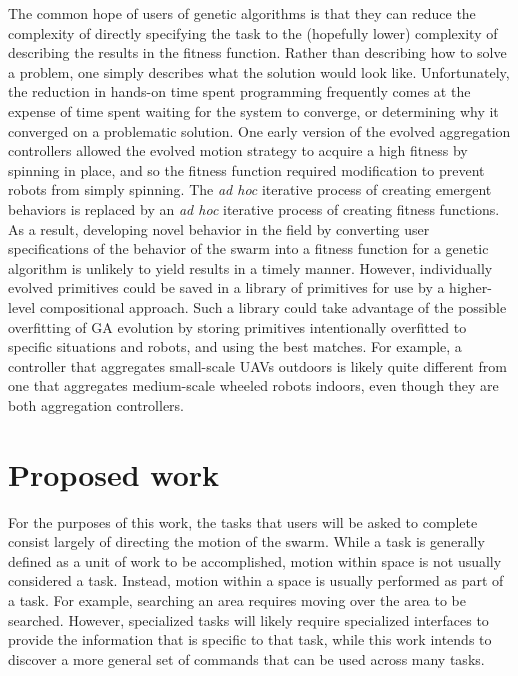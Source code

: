 \documentclass[]{article}
\begin{document}
The common hope of users of genetic algorithms is that they can reduce the complexity of directly specifying the task to the (hopefully lower) complexity of describing the results in the fitness function.
Rather than describing how to solve a problem, one simply describes what the solution would look like. 
Unfortunately, the reduction in hands-on time spent programming frequently comes at the expense of time spent waiting for the system to converge, or determining why it converged on a problematic solution. 
One early version of the evolved aggregation controllers allowed the evolved motion strategy to acquire a high fitness by spinning in place, and so the fitness function required modification to prevent robots from simply spinning. 
The \emph{ad hoc} iterative process of creating emergent behaviors is replaced by an \emph{ad hoc} iterative process of creating fitness functions.
As a result, developing novel behavior in the field by converting user specifications of the behavior of the swarm into a fitness function for a genetic algorithm is unlikely to yield results in a timely manner. 
However, individually evolved primitives could be saved in a library of primitives for use by a higher-level compositional approach. 
Such a library could take advantage of the possible overfitting of GA evolution by storing primitives intentionally overfitted to specific situations and robots, and using the best matches. 
For example, a controller that aggregates small-scale UAVs outdoors is likely quite different from one that aggregates medium-scale wheeled robots indoors, even though they are both aggregation controllers. 

\section{Proposed work}

For the purposes of this work, the tasks that users will be asked to complete consist largely of directing the motion of the swarm. 
While a task is generally defined as a unit of work to be accomplished, motion within space is not usually considered a task. 
Instead, motion within a space is usually performed as part of a task.
For example, searching an area requires moving over the area to be searched.
However, specialized tasks will likely require specialized interfaces to provide the information that is specific to that task, while this work intends to discover a more general set of commands that can be used across many tasks. 
\end{document}
